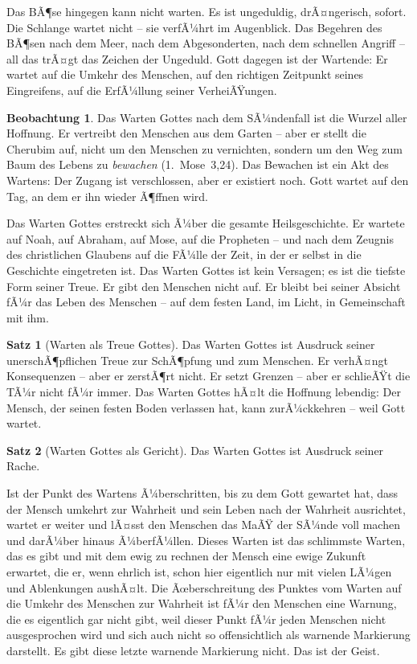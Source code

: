 ﻿\documentclass[a4paper,12pt]{article}
\theoremstyle{definition}
\newtheorem{theorem}{Satz}[section]
\newtheorem{observation}{Beobachtung}[section]
\begin{document}
Das BÃ¶se hingegen kann nicht warten. Es ist ungeduldig, drÃ¤ngerisch, sofort. Die
Schlange wartet nicht -- sie verfÃ¼hrt im Augenblick. Das Begehren des BÃ¶sen nach
dem Meer, nach dem Abgesonderten, nach dem schnellen Angriff -- all das trÃ¤gt das
Zeichen der Ungeduld. Gott dagegen ist der Wartende: Er wartet auf die Umkehr des
Menschen, auf den richtigen Zeitpunkt seines Eingreifens, auf die ErfÃ¼llung seiner
VerheiÃŸungen.

\begin{observation}
	Das Warten Gottes nach dem SÃ¼ndenfall ist die Wurzel aller Hoffnung. Er
	vertreibt den Menschen aus dem Garten -- aber er stellt die Cherubim auf, nicht
	um den Menschen zu vernichten, sondern um den Weg zum Baum des Lebens zu
	\textit{bewachen} (1.~Mose~3,24). Das Bewachen ist ein Akt des Wartens: Der
	Zugang ist verschlossen, aber er existiert noch. Gott wartet auf den Tag, an
	dem er ihn wieder Ã¶ffnen wird.
\end{observation}

Das Warten Gottes erstreckt sich Ã¼ber die gesamte Heilsgeschichte. Er wartete auf
Noah, auf Abraham, auf Mose, auf die Propheten -- und nach dem Zeugnis des
christlichen Glaubens auf die FÃ¼lle der Zeit, in der er selbst in die Geschichte
eingetreten ist. Das Warten Gottes ist kein Versagen; es ist die tiefste Form
seiner Treue. Er gibt den Menschen nicht auf. Er bleibt bei seiner Absicht fÃ¼r
das Leben des Menschen -- auf dem festen Land, im Licht, in Gemeinschaft mit ihm.

\begin{theorem}[Warten als Treue Gottes]
	Das Warten Gottes ist Ausdruck seiner unerschÃ¶pflichen Treue zur SchÃ¶pfung
	und zum Menschen. Er verhÃ¤ngt Konsequenzen -- aber er zerstÃ¶rt nicht. Er setzt
	Grenzen -- aber er schlieÃŸt die TÃ¼r nicht fÃ¼r immer. Das Warten Gottes hÃ¤lt
	die Hoffnung lebendig: Der Mensch, der seinen festen Boden verlassen hat, kann
	zurÃ¼ckkehren -- weil Gott wartet.
\end{theorem}


\begin{theorem}[Warten Gottes als Gericht]
	Das Warten Gottes ist Ausdruck seiner Rache.
\end{theorem}

Ist der Punkt des Wartens Ã¼berschritten, bis zu dem Gott gewartet hat, dass der Mensch umkehrt zur Wahrheit und sein Leben nach der Wahrheit ausrichtet, wartet er weiter und lÃ¤sst den Menschen das MaÃŸ der SÃ¼nde voll machen und darÃ¼ber hinaus Ã¼berfÃ¼llen. Dieses Warten ist das schlimmste Warten, das es gibt und mit dem ewig zu rechnen der Mensch eine ewige Zukunft erwartet, die er, wenn ehrlich ist, schon hier eigentlich nur mit vielen LÃ¼gen und Ablenkungen aushÃ¤lt. Die Ãœberschreitung des Punktes vom Warten auf die Umkehr des Menschen zur Wahrheit ist fÃ¼r den Menschen eine Warnung, die es eigentlich gar nicht gibt, weil dieser Punkt fÃ¼r jeden Menschen nicht ausgesprochen wird und sich auch nicht so offensichtlich als warnende Markierung darstellt. Es gibt diese letzte warnende Markierung nicht. Das ist der Geist.
\end{document}
